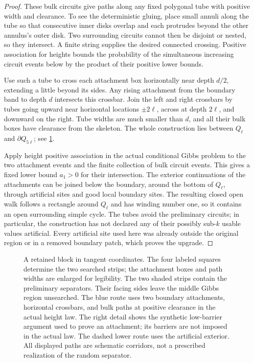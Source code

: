 \begin{proof}
These bulk circuits give paths along any fixed polygonal tube with positive
width and clearance.  To see the deterministic gluing, place small annuli
along the tube so that consecutive inner disks overlap and each protrudes
beyond the other annulus's outer disk.  Two surrounding circuits cannot
then be disjoint or nested, so they intersect.  A finite string supplies
the desired connected crossing.  Positive association for heights bounds
the probability of the simultaneous increasing circuit events below by the
product of their positive lower bounds.

Use such a tube to cross each attachment box horizontally near depth
$d/2$, extending a little beyond its sides.  Any rising attachment from
the boundary band to depth $d$ intersects this crossbar.  Join the left
and right crossbars by tubes going upward near horizontal locations
$\pm2\ell$, across at depth $2\ell$, and downward on the right.  Tube
widths are much smaller than $d$, and all their bulk boxes have clearance
from the skeleton.  The whole construction lies between $Q_\ell$ and
$\partial Q_{5\ell}$; see \cref{fig:boundary-arches}.

Apply height positive association in the actual conditional Gibbs problem
to the two attachment events and the finite collection of bulk circuit
events.  This gives a fixed lower bound $a_1>0$ for their intersection.
The exterior continuations of the attachments can be joined below the
boundary, around the bottom of $Q_\ell$, through artificial sites and
good local boundary sites.  The resulting closed open walk follows a
rectangle around $Q_\ell$ and has winding number one, so it contains an
open surrounding simple cycle.  The tubes avoid the preliminary circuits;
in particular, the construction has not declared any of their possibly
sub-$k$ usable values artificial.  Every artificial site used here was
already outside the original region or in a removed boundary patch,
which proves the upgrade.
\end{proof}

\begin{figure}[tb]
 \centering
 
 \caption{A retained block in tangent coordinates.  The four labeled squares
 determine the two searched strips; the attachment boxes and path widths are
 enlarged for legibility.  The two shaded strips contain the preliminary separators.
 Their facing sides leave the middle Gibbs region unsearched.  The blue
 route uses two boundary attachments, horizontal crossbars, and bulk
 paths at positive clearance in the actual height law.  The right detail
 shows the synthetic low-barrier argument used to prove an attachment;
 its barriers are not imposed in the actual law.  The dashed lower route
 uses the artificial exterior.  All displayed paths are schematic corridors,
 not a prescribed realization of the random separator.}
 \label{fig:boundary-arches}
\end{figure}


